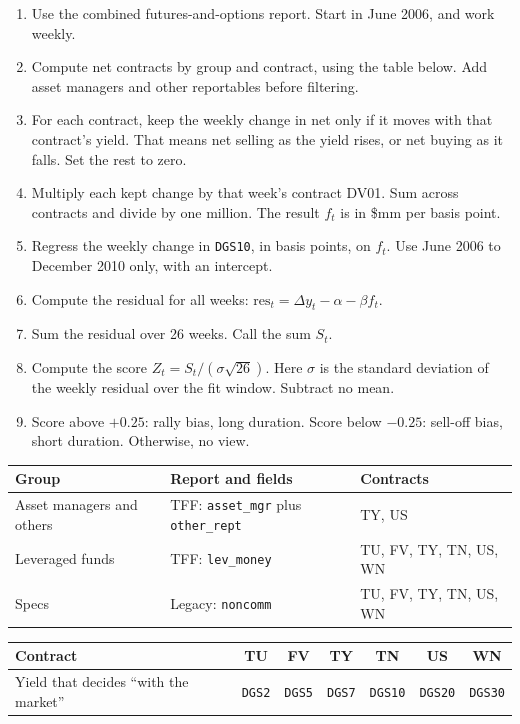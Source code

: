 \documentclass[11pt,a4paper]{article}
\newcommand{\code}[1]{\nolinkurl{#1}}
\newcommand{\sublabel}[1]{\par\vspace{3pt}\needspace{3\baselineskip}{\sffamily\small\bfseries #1}\par\nopagebreak[4]\vspace{1pt}}
\begin{document}
\sublabel{Steps}
\begin{enumerate}
\item Use the combined futures-and-options report. Start in June 2006, and work weekly.
\item Compute net contracts by group and contract, using the table below. Add asset managers and other reportables before filtering.
\item For each contract, keep the weekly change in net only if it moves with that contract's yield. That means net selling as the yield rises, or net buying as it falls. Set the rest to zero.
\item Multiply each kept change by that week's contract DV01. Sum across contracts and divide by one million. The result $f_t$ is in \$mm per basis point.
\item Regress the weekly change in \code{DGS10}, in basis points, on $f_t$. Use June 2006 to December 2010 only, with an intercept.
\item Compute the residual for all weeks: $\text{res}_t = \Delta y_t - \alpha - \beta f_t$.
\item Sum the residual over 26 weeks. Call the sum $S_t$.
\item Compute the score $Z_t = S_t / (\sigma \sqrt{26})$. Here $\sigma$ is the standard deviation of the weekly residual over the fit window. Subtract no mean.
\item Score above $+0.25$: rally bias, long duration. Score below $-0.25$: sell-off bias, short duration. Otherwise, no view.
\end{enumerate}

\begin{center}\small
\begin{tabular}{@{}lll@{}}
\toprule
Group & Report and fields & Contracts \\
\midrule
Asset managers and others & TFF: \code{asset_mgr} plus \code{other_rept} & TY, US \\
Leveraged funds & TFF: \code{lev_money} & TU, FV, TY, TN, US, WN \\
Specs & Legacy: \code{noncomm} & TU, FV, TY, TN, US, WN \\
\bottomrule
\end{tabular}

\medskip
\begin{tabular}{@{}lcccccc@{}}
\toprule
Contract & TU & FV & TY & TN & US & WN \\
\midrule
Yield that decides ``with the market'' & \code{DGS2} & \code{DGS5} & \code{DGS7} & \code{DGS10} & \code{DGS20} & \code{DGS30} \\
\bottomrule
\end{tabular}
\end{center}
\end{document}
